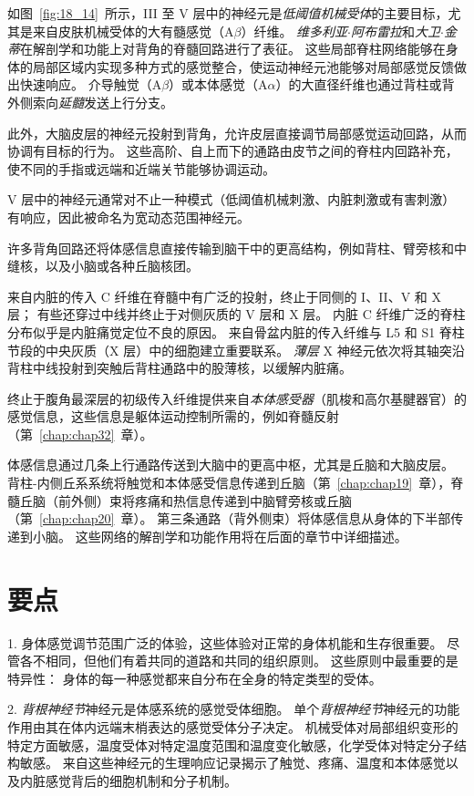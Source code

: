 如图~\ref{fig:18_14}~所示，III 至 V 层中的神经元是\textit{低阈值机械受体}的主要目标，尤其是来自皮肤机械受体的大有髓感觉（A$\beta$）纤维。
\textit{维多利亚$\cdot$阿布雷拉}和\textit{大卫$\cdot$金蒂}在解剖学和功能上对背角的脊髓回路进行了表征\cite{abraira2013sensory}。
这些局部脊柱网络能够在身体的局部区域内实现多种方式的感觉整合，使运动神经元池能够对局部感觉反馈做出快速响应。
介导触觉（A$\beta$）或本体感觉（A$\alpha$）的大直径纤维也通过背柱或背外侧索向\textit{延髓}发送上行分支。


此外，大脑皮层的神经元投射到背角，允许皮层直接调节局部感觉运动回路，从而协调有目标的行为。
这些高阶、自上而下的通路由皮节之间的脊柱内回路补充，使不同的手指或远端和近端关节能够协调运动。


V 层中的神经元通常对不止一种模式（低阈值机械刺激、内脏刺激或有害刺激）有响应，因此被命名为宽动态范围神经元。


许多背角回路还将体感信息直接传输到脑干中的更高结构，例如背柱、臂旁核和中缝核，以及小脑或各种丘脑核团。


来自内脏的传入 C 纤维在脊髓中有广泛的投射，终止于同侧的 I、II、V 和 X 层；
有些还穿过中线并终止于对侧灰质的 V 层和 X 层。
内脏 C 纤维广泛的脊柱分布似乎是内脏痛觉定位不良的原因。 
来自骨盆内脏的传入纤维与 L5 和 S1 脊柱节段的中央灰质（X 层）中的细胞建立重要联系。 
\textit{薄层} X 神经元依次将其轴突沿背柱中线投射到突触后背柱通路中的股薄核，以缓解内脏痛。


终止于腹角最深层的初级传入纤维提供来自\textit{本体感受器}（肌梭和高尔基腱器官）的感觉信息，这些信息是躯体运动控制所需的，例如脊髓反射（第~\ref{chap:chap32}~章）。


体感信息通过几条上行通路传送到大脑中的更高中枢，尤其是丘脑和大脑皮层。
背柱-内侧丘系系统将触觉和本体感受信息传递到丘脑（第~\ref{chap:chap19}~章），脊髓丘脑（前外侧）束将疼痛和热信息传递到中脑臂旁核或丘脑（第~\ref{chap:chap20}~章）。
第三条通路（背外侧束）将体感信息从身体的下半部传递到小脑。
这些网络的解剖学和功能作用将在后面的章节中详细描述。




\section{要点}


1. 身体感觉调节范围广泛的体验，这些体验对正常的身体机能和生存很重要。
尽管各不相同，但他们有着共同的道路和共同的组织原则。
这些原则中最重要的是特异性：
身体的每一种感觉都来自分布在全身的特定类型的受体。 


2. \textit{背根神经节}神经元是体感系统的感觉受体细胞。
单个\textit{背根神经节}神经元的功能作用由其在体内远端末梢表达的感觉受体分子决定。
机械受体对局部组织变形的特定方面敏感，温度受体对特定温度范围和温度变化敏感，化学受体对特定分子结构敏感。
来自这些神经元的生理响应记录揭示了触觉、疼痛、温度和本体感觉以及内脏感觉背后的细胞机制和分子机制。



